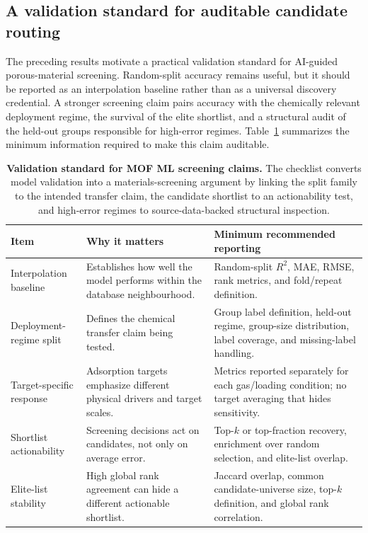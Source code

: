 \documentclass[11pt,a4paper]{article}
\begin{document}
\subsection*{A validation standard for auditable candidate routing}
The preceding results motivate a practical validation standard for AI-guided porous-material screening. Random-split accuracy remains useful, but it should be reported as an interpolation baseline rather than as a universal discovery credential. A stronger screening claim pairs accuracy with the chemically relevant deployment regime, the survival of the elite shortlist, and a structural audit of the held-out groups responsible for high-error regimes. Table~\ref{tab:reporting_checklist} summarizes the minimum information required to make this claim auditable.

\begin{table}[H]
\centering
\caption{\textbf{Validation standard for MOF ML screening claims.} The checklist converts model validation into a materials-screening argument by linking the split family to the intended transfer claim, the candidate shortlist to an actionability test, and high-error regimes to source-data-backed structural inspection.}
\label{tab:reporting_checklist}
\small
\begin{tabular}{p{}p{}p{}}
\toprule
Item & Why it matters & Minimum recommended reporting \\
\midrule
Interpolation baseline & Establishes how well the model performs within the database neighbourhood. & Random-split $R^2$, MAE, RMSE, rank metrics, and fold/repeat definition. \\
Deployment-regime split & Defines the chemical transfer claim being tested. & Group label definition, held-out regime, group-size distribution, label coverage, and missing-label handling. \\
Target-specific response & Adsorption targets emphasize different physical drivers and target scales. & Metrics reported separately for each gas/loading condition; no target averaging that hides sensitivity. \\
Shortlist actionability & Screening decisions act on candidates, not only on average error. & Top-$k$ or top-fraction recovery, enrichment over random selection, and elite-list overlap. \\
Elite-list stability & High global rank agreement can hide a different actionable shortlist. & Jaccard overlap, common candidate-universe size, top-$k$ definition, and global rank correlation. \\

\end{tabular}
\end{table}
\end{document}
